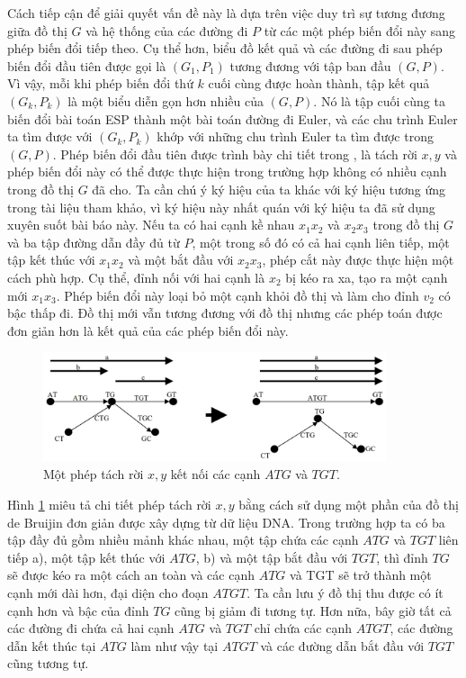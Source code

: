 \documentclass[14pt, a4paper]{article}
\numberwithin{equation}{section}
\numberwithin{figure}{section}
\numberwithin{dl}{section}
\numberwithin{md}{section}
\numberwithin{bd}{section}
\numberwithin{dn}{section}
\numberwithin{hq}{section}
\begin{document}
    Cách tiếp cận để giải quyết vấn đề này là dựa trên việc duy trì sự tương đương giữa đồ thị $G$ và hệ thống của các đường đi $P$ từ các một phép biến đổi này sang phép biến đổi tiếp theo.
    Cụ thể hơn, biểu đồ kết quả và các đường đi sau phép biến đổi đầu tiên được gọi là $(G_1, P_1)$ tương đương với tập ban đầu $(G, P)$.
    Vì vậy, mỗi khi phép biến đổi thứ $k$ cuối cùng được hoàn thành, tập kết quả $(G_k, P_k)$ là một biểu diễn gọn hơn nhiều của $(G, P)$.
    Nó là tập cuối cùng ta biến đổi bài toán ESP thành một bài toán đường đi Euler, và các chu trình Euler ta tìm được với $(G_k, P_k)$ khớp với những chu trình Euler ta tìm được trong $(G, P)$.
    Phép biến đổi đầu tiên được trình bày chi tiết trong \cite{pevzner2001eulerian}, \cite{pevzner2001new} là tách rời $x, y$ và phép biến đổi này có thể được thực hiện trong trường hợp không có nhiều cạnh trong đồ thị $G$ đã cho.
    Ta cần chú ý ký hiệu của ta khác với ký hiệu tương ứng trong tài liệu tham khảo, vì ký hiệu này nhất quán với ký hiệu ta đã sử dụng xuyên suốt bài báo này.
    Nếu ta có hai cạnh kề nhau $x_1 x_2$ và $x_2 x_3$ trong đồ thị $G$ và ba tập đường dẫn đầy đủ từ $P$, một trong số đó có cả hai cạnh liên tiếp, một tập kết thúc với $x_1 x_2$ và một bắt đầu với $x_2 x_3$, phép cắt này được thực hiện một cách phù hợp. Cụ thể, đỉnh nối với hai cạnh là $x_2$ bị kéo ra xa, tạo ra một cạnh mới $x_1 x_3$.
    Phép biến đổi này loại bỏ một cạnh khỏi đồ thị và làm cho đỉnh $v_2$ có bậc thấp đi.
    Đồ thị mới vẫn tương đương với đồ thị nhưng các phép toán được đơn giản hơn là kết quả của các phép biến đổi này.

    \begin{figure}[h!]
        \centering
        \includegraphics[width=0.9\textwidth]{6.png}
        \caption{Một phép tách rời $x, y$ kết nối các cạnh $ATG$ và $TGT$.}
        \label{fig:6}
    \end{figure}

    Hình \ref{fig:6} miêu tả chi tiết phép tách rời $x, y$ bằng cách sử dụng một phần của đồ thị de Bruijin đơn giản được xây dựng từ dữ liệu DNA.
    Trong trường hợp ta có ba tập đầy đủ gồm nhiều mảnh khác nhau, một tập chứa các cạnh $ATG$ và $TGT$  liên tiếp a), một tập kết thúc với $ATG$, b) và một tập bắt đầu với $TGT$, thì đỉnh $TG$ sẽ được kéo ra một cách an toàn và các cạnh $ATG$ và TGT sẽ trở thành một cạnh mới dài hơn, đại diện cho đoạn $ATGT$.
    Ta cần lưu ý đồ thị thu được có ít cạnh hơn và bậc của đỉnh $TG$ cũng bị giảm đi tương tự.
    Hơn nữa, bây giờ tất cả các đường đi chứa cả hai cạnh $ATG$ và $TGT$ chỉ chứa các cạnh $ATGT$, các đường dẫn kết thúc tại $ATG$ làm như vậy tại $ATGT$ và các đường dẫn bắt đầu với $TGT$ cũng tương tự.
\end{document}
